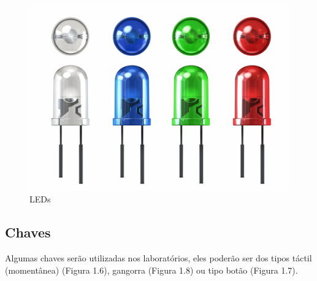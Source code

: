 \begin{figure}[h]
\centering
\includegraphics[scale=1.5]{chapter1/led.png}
\caption{LEDs}
\label{fig:5}
\end{figure}

\subsection{Chaves}
\label{subsec:3}
Algumas chaves serão utilizadas nos laboratórios, eles poderão ser dos tipos táctil (momentânea) (Figura 1.6), gangorra (Figura 1.8) ou tipo botão (Figura 1.7).

